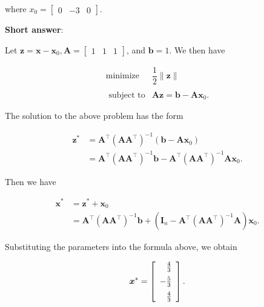 where \(x_{0}=\left[\begin{array}{lll}0 & -3 & 0\end{array}\right]\).

\textbf{Short answer}:

Let \(\boldsymbol{z}=\boldsymbol{x}-\boldsymbol{x}_{0}, \boldsymbol{A}=\left[\begin{array}{lll}1 & 1 & 1\end{array}\right]\), and \(\boldsymbol{b}=1\). We then have

\[
	\begin{array}{rl}
		\operatorname{minimize} & \dfrac{1}{2}\|\boldsymbol{z}\| \\
		& \\
		\text { subject to} & \boldsymbol{A} \boldsymbol{z}=\boldsymbol{b}-\boldsymbol{A} \boldsymbol{x}_{0} .
	\end{array}
\]

The solution to the above problem has the form

\[
	\begin{aligned}
		\boldsymbol{z}^{*} & =\boldsymbol{A}^{\top}\left(\boldsymbol{A} \boldsymbol{A}^{\top}\right)^{-1}\left(\boldsymbol{b}-\boldsymbol{A} \boldsymbol{x}_{0}\right) \\
		& =\boldsymbol{A}^{\top}\left(\boldsymbol{A} \boldsymbol{A}^{\top}\right)^{-1} \boldsymbol{b}-\boldsymbol{A}^{\top}\left(\boldsymbol{A} \boldsymbol{A}^{\top}\right)^{-1} \boldsymbol{A} \boldsymbol{x}_{0} .
	\end{aligned}
\]

Then we have

\[
	\begin{aligned}
		\boldsymbol{x}^{*} & =\boldsymbol{z}^{*}+\boldsymbol{x}_{0} \\
		& =\boldsymbol{A}^{\top}\left(\boldsymbol{A} \boldsymbol{A}^{\top}\right)^{-1} \boldsymbol{b}+\left(\boldsymbol{I}_{n}-\boldsymbol{A}^{\top}\left(\boldsymbol{A} \boldsymbol{A}^{\top}\right)^{-1} \boldsymbol{A}\right) \boldsymbol{x}_{0} .
	\end{aligned}
\]

Substituting the parameters into the formula above, we obtain

\[
	\boldsymbol{x}^{*}=\left[\begin{array}{r}
		\frac{4}{3} \vspace{2mm}\\ 
		-\frac{5}{3} \vspace{2mm}\\
		\frac{4}{3}
	\end{array}\right] .
\]

